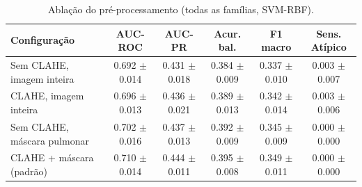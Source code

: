 \begin{table}[ht]
\centering
\caption{Ablação do pré-processamento (todas as famílias, SVM-RBF).}
\label{tab:abl_prep}
\small
\begin{tabular}{lccccc}
\hline
Configuração & AUC-ROC & AUC-PR & Acur. bal. & F1 macro & Sens. Atípico \\
\hline
Sem CLAHE, imagem inteira & 0.692 $\pm$ 0.014 & 0.431 $\pm$ 0.018 & 0.384 $\pm$ 0.009 & 0.337 $\pm$ 0.010 & 0.003 $\pm$ 0.007 \\
CLAHE, imagem inteira & 0.696 $\pm$ 0.013 & 0.436 $\pm$ 0.021 & 0.389 $\pm$ 0.013 & 0.342 $\pm$ 0.014 & 0.003 $\pm$ 0.006 \\
Sem CLAHE, máscara pulmonar & 0.702 $\pm$ 0.016 & 0.437 $\pm$ 0.013 & 0.392 $\pm$ 0.009 & 0.345 $\pm$ 0.009 & 0.000 $\pm$ 0.000 \\
CLAHE + máscara (padrão) & 0.710 $\pm$ 0.014 & 0.444 $\pm$ 0.011 & 0.395 $\pm$ 0.008 & 0.349 $\pm$ 0.011 & 0.000 $\pm$ 0.000 \\
\hline
\end{tabular}
\end{table}